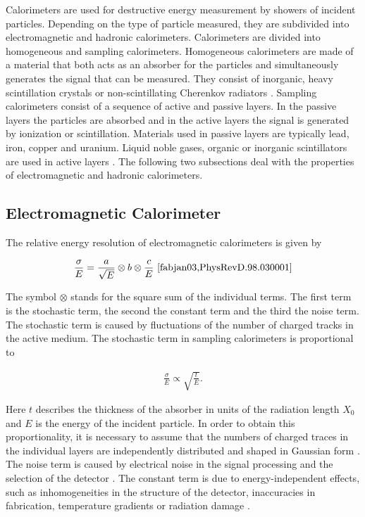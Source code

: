 \documentclass[12pt, a4paper]{thesis}
\begin{document}
Calorimeters are used for destructive energy measurement by showers of incident
particles. Depending on the type of particle measured, they are subdivided into
electromagnetic and hadronic calorimeters. Calorimeters are divided into
homogeneous and sampling calorimeters. Homogeneous calorimeters are made of a
material that both acts as an absorber for the particles and simultaneously
generates the signal that can be measured. They consist of inorganic, heavy
scintillation crystals or non-scintillating Cherenkov radiators
\cite{PhysRevD.98.030001}. Sampling calorimeters consist of a sequence of active
and passive layers. In the passive layers the particles are absorbed and in the
active layers the signal is generated by ionization or scintillation. Materials
used in passive layers are typically lead, iron, copper and uranium. Liquid
noble gases, organic or inorganic scintillators are used in active layers
\cite{PhysRevD.98.030001}. The following two subsections deal with the properties
of electromagnetic and hadronic calorimeters.

\subsection{Electromagnetic Calorimeter}
\label{sec:orgff20d8b}

The relative energy resolution of electromagnetic calorimeters is
given by 

\begin{align}
\frac{\sigma}{E} = \frac{a}{\sqrt{E}} \otimes b \otimes \frac{c}{E}\ \cite{fabjan03,PhysRevD.98.030001}
\end{align}

The symbol \(\otimes\) stands for the square sum of the individual terms. The
first term is the stochastic term, the second the constant term and the third
the noise term.  The stochastic term is caused by fluctuations of the number of
charged tracks in the active medium. The stochastic term in sampling
calorimeters is proportional to

\begin{align}
\frac{\sigma}{E}\propto \sqrt{\frac{t}{E}}.
\end{align}

Here \(t\) describes the thickness of the absorber in units of the
radiation length \(X_0\) and \(E\) is the energy of the incident
particle. In order to obtain this proportionality, it is necessary to
assume that the numbers of charged traces in the individual layers are
independently distributed and shaped in Gaussian form \cite{amaldi81}. The
noise term is caused by electrical noise in the signal processing and
the selection of the detector \cite{fabjan03}. The constant term is due to
energy-independent effects, such as inhomogeneities in the structure
of the detector, inaccuracies in fabrication, temperature gradients or
radiation damage \cite{fabjan03}.
\end{document}

